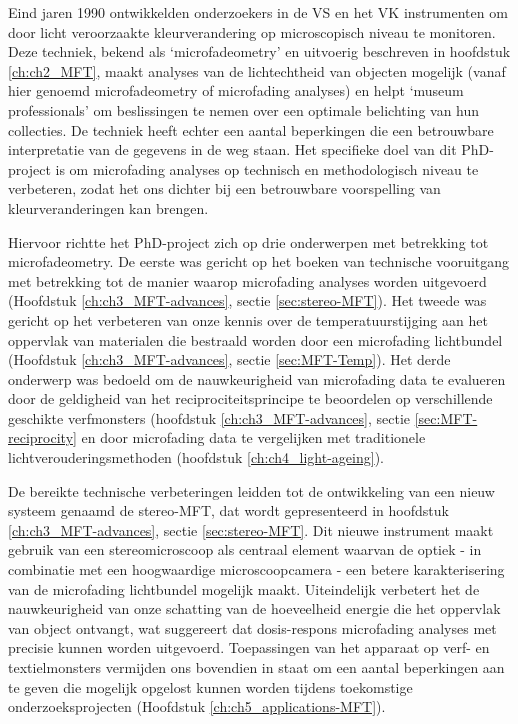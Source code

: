 Eind jaren 1990 ontwikkelden onderzoekers in de VS en het VK instrumenten om door licht veroorzaakte kleurverandering op microscopisch niveau te monitoren. Deze techniek, bekend als ‘microfadeometry’ en uitvoerig beschreven in hoofdstuk \ref{ch:ch2_MFT}, maakt analyses van de lichtechtheid van objecten mogelijk (vanaf hier genoemd microfadeometry of microfading analyses) en helpt ‘museum professionals’ om beslissingen te nemen over een optimale belichting van hun collecties. De techniek heeft echter een aantal beperkingen die een betrouwbare interpretatie van de gegevens in de weg staan. Het specifieke doel van dit PhD-project is om microfading analyses op technisch en methodologisch niveau te verbeteren, zodat het ons dichter bij een betrouwbare voorspelling van kleurveranderingen kan brengen. 

Hiervoor richtte het PhD-project zich op drie onderwerpen met betrekking tot microfadeometry. De eerste was gericht op het boeken van technische vooruitgang met betrekking tot de manier waarop microfading analyses worden uitgevoerd (Hoofdstuk \ref{ch:ch3_MFT-advances}, sectie \ref{sec:stereo-MFT}). Het tweede was gericht op het verbeteren van onze kennis over de temperatuurstijging aan het oppervlak van materialen die bestraald worden door een microfading lichtbundel (Hoofdstuk \ref{ch:ch3_MFT-advances}, sectie \ref{sec:MFT-Temp}). Het derde onderwerp was bedoeld om de nauwkeurigheid van microfading data te evalueren door de geldigheid van het reciprociteitsprincipe te beoordelen op verschillende geschikte verfmonsters (hoofdstuk \ref{ch:ch3_MFT-advances}, sectie \ref{sec:MFT-reciprocity} en door microfading data te vergelijken met traditionele lichtverouderingsmethoden (hoofdstuk \ref{ch:ch4_light-ageing}).


De bereikte technische verbeteringen leidden tot de ontwikkeling van een nieuw systeem genaamd de stereo-MFT, dat wordt gepresenteerd in hoofdstuk \ref{ch:ch3_MFT-advances}, sectie \ref{sec:stereo-MFT}. Dit nieuwe instrument maakt gebruik van een stereomicroscoop als centraal element waarvan de optiek - in combinatie met een hoogwaardige microscoopcamera - een betere karakterisering van de microfading lichtbundel mogelijk maakt. Uiteindelijk verbetert het de nauwkeurigheid van onze schatting van de hoeveelheid energie die het oppervlak van object ontvangt, wat suggereert dat dosis-respons microfading analyses met precisie kunnen worden uitgevoerd. Toepassingen van het apparaat op verf- en textielmonsters vermijden ons bovendien in staat om een aantal beperkingen aan te geven die mogelijk opgelost kunnen worden tijdens toekomstige onderzoeksprojecten (Hoofdstuk \ref{ch:ch5_applications-MFT}).

